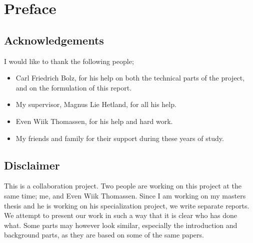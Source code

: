 
\chapter*{Preface}

\section*{Acknowledgements}

I would like to thank the following people;

\begin{itemize}

\item Carl Friedrich Bolz, for his help on both the technical parts
of the project, and on the formulation of this report.

\item My supervisor, Magnus Lie Hetland, for all his help.

\item Even Wiik Thomassen, for his help and hard work.

\item My friends and family for their support during these years of study.

\end{itemize}


\section*{Disclaimer}

This is a collaboration project. Two people are working on this
project at the same time; me, and Even Wiik Thomassen. Since I am working
on my masters thesis and he is working on his specialization project, we 
write separate reports. We attempt to present our work in such a way that
it is clear who has done what. Some parts may however look similar,
especially the introduction and background parts, as they are based on 
some of the same papers.


